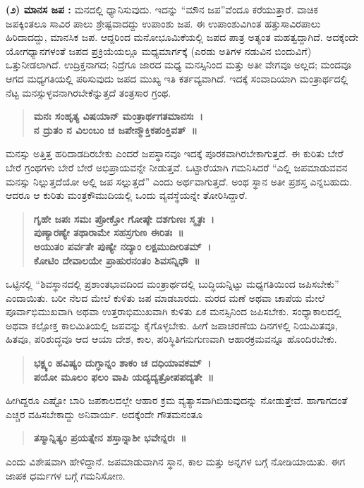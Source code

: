 {\textbf{(೨) ಮಾನಸ ಜಪ :} ಮನದಲ್ಲಿ ಧ್ಯಾನಿಸುವುದು. ಇದನ್ನು “ಮೌನ ಜಪ”ವೆಂದೂ ಕರೆಯುತ್ತಾರೆ. ವಾಚಿಕ ಜಪಕ್ಕಿಂತಲೂ ಸಾವಿರ ಪಾಲು ಶ್ರೇಷ್ಟವಾದದ್ದು ಉಪಾಂಶು ಜಪ. ಈ ಉಪಾಂಶುವಿಗಿಂತ ಹತ್ತುಸಾವಿರಪಾಲು ಹಿರಿದಾದದ್ದು, ಮಾನಸಿಕ ಜಪ. ಆದ್ದರಿಂದ ಮನೋಭೂಮಿಕೆಯಲ್ಲಿ ಜಪದ ಪಾತ್ರ ಅತ್ಯಂತ ಮಹತ್ವದ್ದಾಗಿದೆ. ಅದಕ್ಕೆಂದೇ ಯೋಗಧ್ಯಾನಗಳಂತೆ ಜಪದ ಪ್ರಕ್ರಿಯೆಯಲ್ಲೂ ಮಧ್ಯಮಾರ್ಗಕ್ಕೆ (ಎರಡು ಅತಿಗಳ ನಡುವಿನ ಬಿಂದುವಿಗೆ) ಒತ್ತುನೀಡಲಾಗಿದೆ. ಉದ್ರಿಕ್ತನಾಗದ; ನಿದ್ರೆಗೂ ಜಾರದ ಮಧ್ಯ ಮನಸ್ಸಿನಿಂದ ಮತ್ತು ಅತೀ ವೇಗವೂ ಅಲ್ಲದ; ಮಂದವೂ ಆಗದ ಮಧ್ಯಗತಿಯಲ್ಲಿ ಪಠಿಸುವುದು ಜಪದ ಮುಖ್ಯ ಇತಿ ಕರ್ತವ್ಯವಾಗಿದೆ. ಇದಕ್ಕೆ ಸಂವಾದಿಯಾಗಿ ಮಂತ್ರಾರ್ಥದಲ್ಲಿ ನೆಟ್ಟ ಮನಸ್ಸುಳ್ಳವನಾಗಿರಬೇಕೆನ್ನುತ್ತದೆ ತಂತ್ರಸಾರ ಗ್ರಂಥ.
\begin{verse}
\textbf{ಮನಃ ಸಂಹೃತ್ಯ ವಿಷಯಾನ್ ಮಂತ್ರಾರ್ಥಗತಮಾನಸಃ~। \\
ನ ದ್ರುತಂ ನ ವಿಲಂಬಂ ಚ ಜಪೇನ್ಮೌಕ್ತಿಕಪಂಕ್ತಿವತ್~॥}
\end{verse}
ಮನಸ್ಸು ಅತ್ತಿತ್ತ ಹರಿದಾಡದಿರಬೇಕು ಎಂದರೆ ಜಪಸ್ಥಾನವೂ ಇದಕ್ಕೆ ಪೂರಕವಾಗಿರಬೇಕಾಗುತ್ತದೆ. ಈ ಕುರಿತು ಬೇರೆ ಬೇರೆ ಗ್ರಂಥಗಳು ಬೇರೆ ಬೇರೆ ಅಭಿಪ್ರಾಯವನ್ನೇ ನೀಡುತ್ತವೆ. ಒಟ್ಟಾರೆಯಾಗಿ ಗಮನಿಸಿದರೆ “ಎಲ್ಲಿ ಜಪಮಾಡುವವನ ಮನಸ್ಸು ನಿಲ್ಲುತ್ತದೆಯೋ ಅಲ್ಲಿ ಜಪ ಸಲ್ಲುತ್ತದೆ” ಎಂದು ಅರ್ಥವಾಗುತ್ತದೆ. ಅಂಥ ಸ್ಥಾನ ಅತೀ ಪ್ರಶಸ್ತ ಎನ್ನಬಹುದು. ಆದರೂ ಆ ಕುರಿತು ಮಂತ್ರಕೌಮುದಿಯಲ್ಲಿ ಒಂದು ವ್ಯವಸ್ಥೆಯನ್ನೇ ತೋರಿಸಿದ್ದಾರೆ.
\begin{verse}
\textbf{ಗೃಹೇ ಜಪಃ ಸಮಃ ಪ್ರೋಕ್ತೋ ಗೋಷ್ಠೇ ದಶಗುಣಃ ಸ್ಮೃತಃ~। \\
ಪುಣ್ಯಾರಣ್ಯೇ ತಥಾರಾಮೇ ಸಹಸ್ರಗುಣ ಈರಿತಃ~॥\\
ಅಯುತಂ ಪರ್ವತೇ ಪುಣ್ಯೇ ನದ್ಯಾಂ ಲಕ್ಷಮುದೀರಿತಮ್~। \\
ಕೋಟಿಂ ದೇವಾಲಯೇ ಪ್ರಾಹುರನಂತಂ ಶಿವಸನ್ನಿಧೌ~॥}
\end{verse}
ಒಟ್ಟಿನಲ್ಲಿ “ಶಿವಸ್ಥಾನದಲ್ಲಿ ಪ್ರಶಾಂತಭಾವದಿಂದ ಮಂತ್ರಾರ್ಥದಲ್ಲಿ ಬುದ್ಧಿಯನ್ನಿಟ್ಟು ಮಧ್ಯಗತಿಯಿಂದ ಜಪಿಸಬೇಕು” ಎಂದಾಯಿತು. ಬರೀ ನೆಲದ ಮೇಲೆ ಕುಳಿತು ಜಪ ಮಾಡಬಾರದು. ಮರದ ಮಣೆ ಅಥವಾ ಚಾಪೆಯ ಮೇಲೆ ಪೂರ್ವಾಭಿಮುಖವಾಗಿ ಅಥವಾ ಉತ್ತರಾಭಿಮುಖವಾಗಿ ಕುಳಿತು ಏಕ ಮನಸ್ಸಿನಿಂದ ಜಪಿಸಬೇಕು. ಸಂಧ್ಯಾ\-ಕಾಲದಲ್ಲಿ ಅಥವಾ ಕಲ್ಪೋಕ್ತ ಕಾಲಮಿತಿಯಲ್ಲಿ ಜಪವನ್ನು ಕೈಗೊಳ್ಳಬೇಕು. ಹೀಗೆ ಜಪಾ\-ಚರಣೆಯ ದಿನಗಳಲ್ಲಿ ನಿಯಮಿತವೂ, ಹಿತವೂ, ಪರಿಶುದ್ಧವೂ ಆದ ಆಯಾ ದೇಶ, ಕಾಲ, ಪರಿಸ್ಥಿತಿಗನುಗುಣವಾಗಿ ಆಹಾರಕ್ರಮವನ್ನೂ ಹೊಂದಿರಬೇಕು. 
\begin{verse}
\textbf{ಭಕ್ಷ್ಯಂ ಹವಿಷ್ಯಂ ದುಗ್ಧಾನ್ನಂ ಶಾಕಂ ಚ ದಧಿಯಾವಕಮ್~। \\
ಪಯೋ ಮೂಲಂ ಫಲಂ ವಾಪಿ ಯದ್ಯದ್ಯತ್ರೋಪಪದ್ಯತೇ~॥}
\end{verse}
ಹೀಗಿದ್ದರೂ ಎಷ್ಟೋ ಬಾರಿ ಜಪಕಾಲದಲ್ಲೇ ಆಹಾರ ಕ್ರಮ ವ್ಯತ್ಯಾಸವಾಗಿಬಿಡುವುದನ್ನು ನೋಡುತ್ತೇವೆ. ಹಾಗಾಗದಂತೆ ಎಚ್ಚರ ವಹಿಸಬೇಕಾದ್ದು ಅನಿವಾರ್ಯ. ಅದಕ್ಕೆಂದೇ ಗೌತಮನಂತೂ 
\begin{verse}
\textbf{ತಸ್ಮಾನ್ನಿತ್ಯಂ ಪ್ರಯತ್ನೇನ ಶಸ್ತಾನ್ನಾಶೀ ಭವೇನ್ನರಃ~॥ }
\end{verse}
ಎಂದು ವಿಶೇಷವಾಗಿ ಹೇಳಿದ್ದಾನೆ. ಜಪಮಾಡುವಾಗಿನ ಸ್ಥಾನ, ಕಾಲ ಮತ್ತು ಅನ್ನಗಳ ಬಗ್ಗೆ ನೋಡಿಯಾಯಿತು. ಈಗ ಜಾಪಕ ಧರ್ಮಗಳ ಬಗ್ಗೆ ಗಮನಿಸೋಣ. 
}
